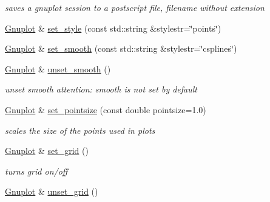 \begin{DoxyCompactItemize}
\begin{DoxyCompactList}\small\item\em saves a gnuplot session to a postscript file, filename without extension \item\end{DoxyCompactList}\item 
\hyperlink{class_gnuplot}{Gnuplot} \& \hyperlink{class_gnuplot_acfdcda292650775ebed4683e8e1515b5}{set\_\-style} (const std::string \&stylestr=\char`\"{}points\char`\"{})
\item 
\hyperlink{class_gnuplot}{Gnuplot} \& \hyperlink{class_gnuplot_aa18386919da2ec4c994f1f9c7195d384}{set\_\-smooth} (const std::string \&stylestr=\char`\"{}csplines\char`\"{})
\item 
\hyperlink{class_gnuplot}{Gnuplot} \& \hyperlink{class_gnuplot_ad9dfbccd66dece1dbe5803605c6ab08c}{unset\_\-smooth} ()
\begin{DoxyCompactList}\small\item\em unset smooth attention: smooth is not set by default \item\end{DoxyCompactList}\item 
\hypertarget{class_gnuplot_a95ec1636a871447dfe99463b769339c7}{
\hyperlink{class_gnuplot}{Gnuplot} \& \hyperlink{class_gnuplot_a95ec1636a871447dfe99463b769339c7}{set\_\-pointsize} (const double pointsize=1.0)}
\label{class_gnuplot_a95ec1636a871447dfe99463b769339c7}

\begin{DoxyCompactList}\small\item\em scales the size of the points used in plots \item\end{DoxyCompactList}\item 
\hypertarget{class_gnuplot_a5416c8e81f1b9945b9631fa85a8d4f47}{
\hyperlink{class_gnuplot}{Gnuplot} \& \hyperlink{class_gnuplot_a5416c8e81f1b9945b9631fa85a8d4f47}{set\_\-grid} ()}
\label{class_gnuplot_a5416c8e81f1b9945b9631fa85a8d4f47}

\begin{DoxyCompactList}\small\item\em turns grid on/off \item\end{DoxyCompactList}\item 
\hypertarget{class_gnuplot_a53183e1487bc6977f0d46bf75d19b4d3}{
\hyperlink{class_gnuplot}{Gnuplot} \& \hyperlink{class_gnuplot_a53183e1487bc6977f0d46bf75d19b4d3}{unset\_\-grid} ()}
\label{class_gnuplot_a53183e1487bc6977f0d46bf75d19b4d3}


\end{DoxyCompactItemize}
